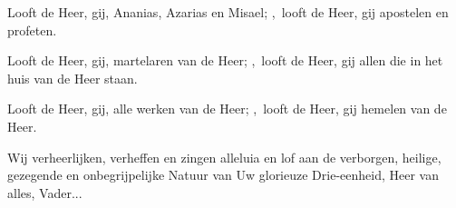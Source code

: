 \documentclass[12pt,twoside,a5paper]{article}
\begin{document}
\begin{halfparskip}
  Looft de Heer, gij, Ananias, Azarias en Misael; \sep~looft de Heer, gij apostelen en profeten.

  Looft de Heer, gij, martelaren van de Heer; \sep~looft de Heer, gij allen die in het huis van de Heer staan.

   Looft de Heer, gij, alle werken van de Heer; \sep~looft de Heer, gij hemelen van de Heer. 
\end{halfparskip}

\begin{halfparskip}
   Wij verheerlijken, verheffen en zingen alleluia en lof aan de verborgen, heilige,
  gezegende en onbegrijpelijke Natuur van Uw glorieuze Drie-eenheid, Heer van alles, Vader...
\end{halfparskip}
\end{document}
